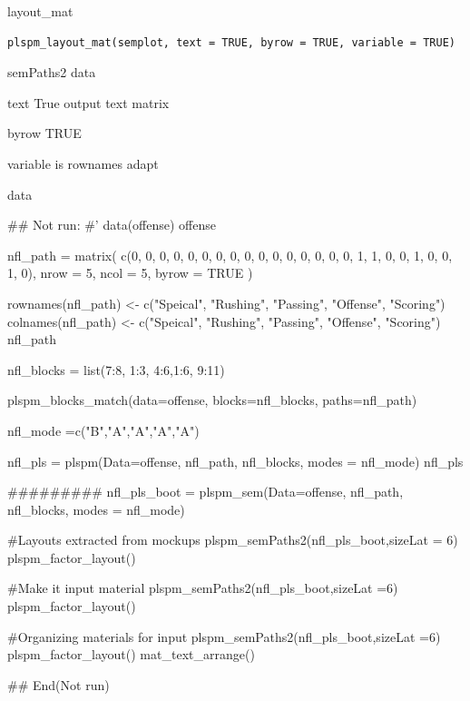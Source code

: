 \documentclass[a4paper]{book}
\begin{document}
%
\begin{Description}
layout\_mat
\end{Description}
%
\begin{Usage}
\begin{verbatim}
plspm_layout_mat(semplot, text = TRUE, byrow = TRUE, variable = TRUE)
\end{verbatim}
\end{Usage}
%
\begin{Arguments}
\begin{ldescription}
\item[\code{semplot}] semPaths2 data

\item[\code{text}] text True output text matrix

\item[\code{byrow}] byrow TRUE

\item[\code{variable}] variable is rownames adapt
\end{ldescription}
\end{Arguments}
%
\begin{Value}
data
\end{Value}
%
\begin{Examples}
\begin{ExampleCode}


\#\# Not run: 
#'
data(offense)
offense %

nfl_path = matrix(
  c(0, 0, 0, 0, 0,
    0, 0, 0, 0, 0,
    0, 0, 0, 0, 0,
    0, 1, 1, 0, 0,
    1, 0, 0, 1, 0),
  nrow = 5, ncol = 5, byrow = TRUE )

rownames(nfl_path) <- c("Speical", "Rushing", "Passing", "Offense", "Scoring")
colnames(nfl_path) <- c("Speical", "Rushing", "Passing", "Offense", "Scoring")
nfl_path

nfl_blocks = list(7:8, 1:3, 4:6,1:6, 9:11)

plspm_blocks_match(data=offense, blocks=nfl_blocks,
                   paths=nfl_path)

nfl_mode =c("B","A","A","A","A")

nfl_pls = plspm(Data=offense, nfl_path, nfl_blocks, modes = nfl_mode)
nfl_pls%

#########
nfl_pls_boot = plspm_sem(Data=offense, nfl_path, nfl_blocks, modes = nfl_mode)

#Layouts extracted from mockups
plspm_semPaths2(nfl_pls_boot,sizeLat = 6)%
  plspm_factor_layout()

#Make it input material
plspm_semPaths2(nfl_pls_boot,sizeLat =6)%
  plspm_factor_layout() %

#Organizing materials for input
plspm_semPaths2(nfl_pls_boot,sizeLat =6)%
  plspm_factor_layout() %
  mat_text_arrange()

## End(Not run)

\end{ExampleCode}
\end{Examples}
\end{document}
